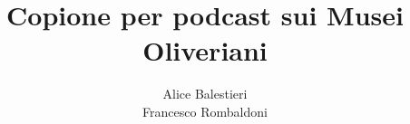 \documentclass[hidelinks,12pt,a4paper]{article}
\begin{document}
	\begin{flushleft}
		
		\title{\textbf{Copione per podcast sui Musei Oliveriani}}
		\author{Alice Balestieri\\Francesco Rombaldoni}
		\date{}
		
		\maketitle
		
		\setcounter{page}{1}
		\newpage
		
		\tableofcontents
		\newpage
		
		
		
		\vspace*{\fill}
		\doclicenseThis
	\end{flushleft}
\end{document}
